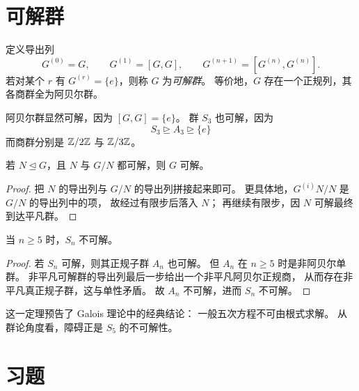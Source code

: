 \section{可解群}
\begin{definition}
定义导出列
\[
G^{(0)}=G,\qquad G^{(1)}=[G,G],\qquad G^{(n+1)}=[G^{(n)},G^{(n)}].
\]
若对某个 $r$ 有 $G^{(r)}=\{e\}$，则称 $G$ 为\emph{可解群}。
等价地，$G$ 存在一个正规列，其各商群全为阿贝尔群。
\end{definition}
\begin{example}
阿贝尔群显然可解，因为 $[G,G]=\{e\}$。
群 $S_3$ 也可解，因为
\[
S_3\trianglerighteq A_3\trianglerighteq \{e\}
\]
而商群分别是 $\mathbb{Z}/2\mathbb{Z}$ 与 $\mathbb{Z}/3\mathbb{Z}$。
\end{example}
\begin{proposition}
若 $N\trianglelefteq G$，且 $N$ 与 $G/N$ 都可解，则 $G$ 可解。
\end{proposition}
\begin{proof}
把 $N$ 的导出列与 $G/N$ 的导出列拼接起来即可。
更具体地，$G^{(i)}N/N$ 是 $G/N$ 的导出列中的项，
故经过有限步后落入 $N$；
再继续有限步，因 $N$ 可解最终到达平凡群。
\end{proof}
\begin{theorem}
当 $n\ge5$ 时，$S_n$ 不可解。
\end{theorem}
\begin{proof}
若 $S_n$ 可解，则其正规子群 $A_n$ 也可解。
但 $A_n$ 在 $n\ge5$ 时是非阿贝尔单群。
非平凡可解群的导出列最后一步给出一个非平凡阿贝尔正规商，
从而存在非平凡真正规子群，这与单性矛盾。
故 $A_n$ 不可解，进而 $S_n$ 不可解。
\end{proof}
\begin{remark}
这一定理预告了 Galois 理论中的经典结论：
一般五次方程不可由根式求解。
从群论角度看，障碍正是 $S_5$ 的不可解性。
\end{remark}
\section*{习题}
